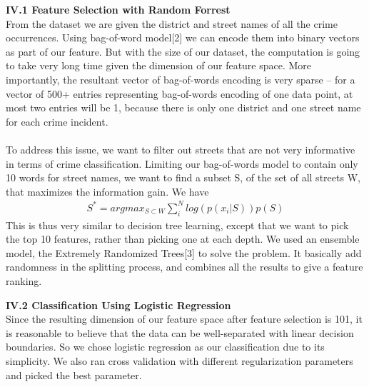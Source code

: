 \documentclass[12pt]{article}
\newenvironment{p3}[2][Part IV Methods]{\begin{trivlist}
\item[\hskip \labelsep {\bfseries #1}\hskip \labelsep {\bfseries #2}]}{\end{trivlist}}
\begin{document}
\begin{p3}{}
\item{\textbf{IV.1 Feature Selection with Random Forrest\\}}
From the dataset we are given the district and street names of all the crime occurrences. Using bag-of-word model[2] we can encode them into binary vectors as part of our feature. But with the size of our dataset, the computation is going to take very long time given the dimension of our feature space. More importantly, the resultant vector of bag-of-words encoding is very sparse -- for a vector of 500+ entries representing bag-of-words encoding of one data point, at most two entries will be 1, because there is only one district and one street name for each crime incident.\\\\
To address this issue, we want to filter out streets that are not very informative in terms of crime classification. Limiting our bag-of-words model to contain only 10 words for street names, we want to find a subset S, of the set of all streets W, that maximizes the information gain. We have
\begin{align*}
	S^* = argmax_{S \subset W} \sum_i^N log(p(x_i|S)) p(S)
\end{align*}
This is thus very similar to decision tree learning, except that we want to pick the top 10 features, rather than picking one at each depth. We used an ensemble model, the Extremely Randomized Trees[3] to solve the problem. It basically add randomness in the splitting process, and combines all the results to give a feature ranking.\\

\item{\textbf{IV.2 Classification Using Logistic Regression\\}}
Since the resulting dimension of our feature space after feature selection is 101, it is reasonable to believe that the data can be well-separated with linear decision boundaries. So we chose logistic regression as our classification due to its simplicity. We also ran cross validation with different regularization parameters and picked the best parameter.
\end{p3}
\end{document}
